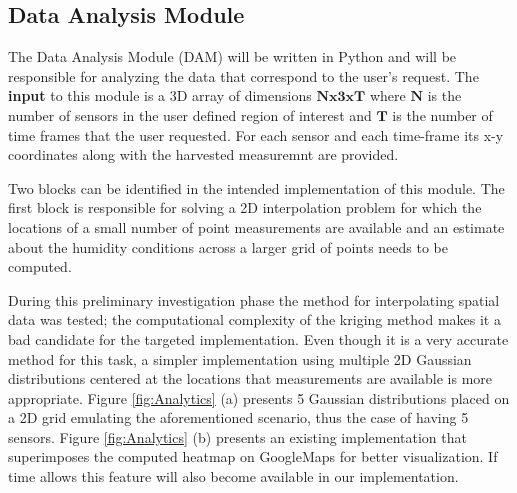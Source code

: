 \documentclass{article}
\begin{document}
\subsection{Data Analysis Module}

The Data Analysis Module (DAM) will be written in Python and will be responsible for analyzing the data that correspond to the user's request. The \textbf{input} to this module is a 3D array of dimensions $\mathbf{Nx3xT}$ where $\mathbf{N}$ is the number of sensors in the user defined region of interest and $\mathbf{T}$ is the number of time frames that the user requested. For each sensor and each time-frame its x-y coordinates along with the harvested measuremnt are provided.

Two blocks can be identified in the intended implementation of this module. The first block is responsible for solving a 2D interpolation problem for which the locations of a small number of point measurements are available and an estimate about the humidity conditions across a larger grid of points needs to be computed. 

During this preliminary investigation phase the \tekriging method for interpolating spatial data was tested; the computational complexity of the kriging method makes it a bad candidate for the targeted implementation. Even though it is a very accurate method for this task, a simpler implementation using multiple 2D Gaussian distributions centered at the locations that measurements are available is more appropriate. Figure \ref{fig:Analytics} (a) presents 5 Gaussian distributions placed on a 2D grid emulating the  aforementioned scenario, thus the case of having 5 sensors. Figure \ref{fig:Analytics} (b) presents an existing implementation that superimposes the computed heatmap on GoogleMaps for better visualization. If time allows this feature will also become available in our implementation. 
\end{document}
